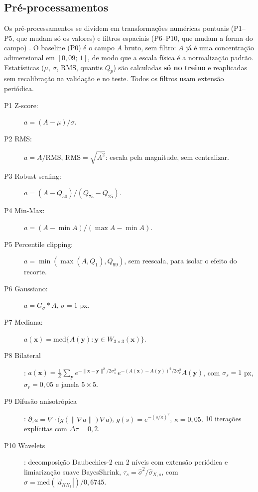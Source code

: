 \subsection{Pré-processamentos}
\label{sec:pre}
Os pré-processamentos se dividem em transformações numéricas pontuais (P1--P5, que mudam só os
valores) e filtros espaciais (P6--P10, que mudam a forma do campo) \cite{gonzalez2018}. O baseline
(P0) é o campo $A$ bruto, sem filtro: $A$ já é uma concentração adimensional em $[0{,}09;\,1]$, de
modo que a escala física é a normalização padrão. Estatísticas ($\mu$, $\sigma$, RMS, quantis
$Q_p$) são calculadas \textbf{só no treino} e reaplicadas sem recalibração na validação e no teste.
Todos os filtros usam extensão periódica.
\begin{description}
  \item[P1 Z-score:] $a = (A-\mu)/\sigma$.
  \item[P2 RMS:] $a = A/\mathrm{RMS}$, $\mathrm{RMS}=\sqrt{\overline{A^2}}$: escala pela magnitude, sem centralizar.
  \item[P3 Robust scaling:] $a = (A - Q_{50})/(Q_{75}-Q_{25})$.
  \item[P4 Min-Max:] $a = (A-\min A)/(\max A-\min A)$.
  \item[P5 Percentile clipping:] $a = \min(\max(A, Q_{1}), Q_{99})$, sem reescala, para isolar o
    efeito do recorte.
  \item[P6 Gaussiano:] $a = G_\sigma * A$, $\sigma = 1$ px.
  \item[P7 Mediana:] $a(\mathbf{x}) = \mathrm{med}\{A(\mathbf{y}) : \mathbf{y}\in W_{3\times3}(\mathbf{x})\}$.
  \item[P8 Bilateral] \cite{tomasi1998}: $a(\mathbf{x}) = \frac{1}{Z}\sum_{\mathbf{y}} e^{-\|\mathbf{x}-\mathbf{y}\|^2/2\sigma_s^2}\, e^{-(A(\mathbf{x})-A(\mathbf{y}))^2/2\sigma_r^2}A(\mathbf{y})$,
    com $\sigma_s=1$ px, $\sigma_r=0{,}05$ e janela $5\times5$.
  \item[P9 Difusão anisotrópica] \cite{perona1990}: $\partial_\tau a = \nabla\cdot\big(g(\|\nabla a\|)\nabla a\big)$,
    $g(s) = e^{-(s/\kappa)^2}$, $\kappa=0{,}05$, 10 iterações explícitas com $\Delta\tau=0{,}2$.
  \item[P10 Wavelets] \cite{donoho1994,chang2000}: decomposição Daubechies-2 em 2 níveis com
    extensão periódica e limiarização suave BayesShrink,
    $\tau_s = \hat\sigma^2/\hat\sigma_{X,s}$, com $\hat\sigma = \mathrm{med}(|d_{HH_1}|)/0{,}6745$.
\end{description}

